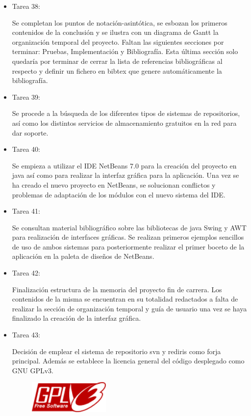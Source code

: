 \begin{itemize}
\item Tarea 38:

Se completan los puntos de notación-asintótica, se esbozan los primeros contenidos de la conclusión y se ilustra con un diagrama de Gantt la organización temporal del proyecto. Faltan las siguientes secciones por terminar: Pruebas, Implementación y Bibliografía. Esta última sección solo quedaría por terminar de cerrar la lista de referencias bibliográficas al respecto y definir un fichero en bibtex que genere automáticamente la bibliografía.\\

\item Tarea 39:

Se procede a la búsqueda de los diferentes tipos de sistemas de repositorios, así como los distintos servicios de almacenamiento gratuitos en la red para dar soporte. \\

\item Tarea 40:

Se empieza a utilizar el IDE NetBeans 7.0 para la creación del proyecto en java así como para realizar la interfaz gráfica para la aplicación. Una vez se ha creado el nuevo proyecto en NetBeans, se solucionan conflictos y problemas de adaptación de los módulos con el nuevo sistema del IDE. 

\item Tarea 41:

Se consultan material bibliográfico sobre las bibliotecas de java Swing y AWT para realización de interfaces gráficas. Se realizan primeros ejemplos sencillos de uso de ambos sistemas para posteriormente realizar el primer boceto de la aplicación en la paleta de diseños de NetBeans. \\

\item Tarea 42:

Finalización estructura de la memoria del proyecto fin de carrera. Los contenidos de la misma se encuentran en su totalidad redactados a falta de realizar la sección de organización temporal y guía de usuario una vez se haya finalizado la creación de la interfaz gráfica. \\

\item Tarea 43:

Decisión de emplear el sistema de repositorio svn y rediris como forja principal. Además se establece la licencia general del código desplegado como GNU GPLv3.
\begin{figure}[H]
\begin{center}
\includegraphics[width=4cm]{./imagenes_documentacion/gplv3.png}
\end{center}
\end{figure}


\end{itemize}
